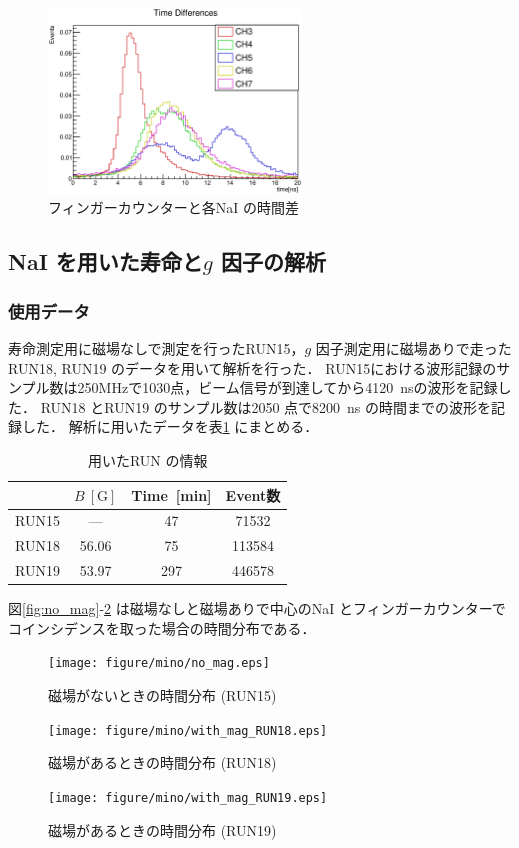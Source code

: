 \begin{figure}[hbt]
\centering
\includegraphics[width=0.6\textwidth]{figure/hatano/coincidence.eps}
\caption{フィンガーカウンターと各NaI の時間差}
\label{hatano_fig:coincidence}
\end{figure}


\subsection{NaI を用いた寿命と$g$ 因子の解析}
\subsubsection{使用データ}
寿命測定用に磁場なしで測定を行ったRUN15，$g$ 因子測定用に磁場ありで走ったRUN18, RUN19 のデータを用いて解析を行った．
RUN15における波形記録のサンプル数は250MHzで1030点，ビーム信号が到達してから4120~nsの波形を記録した．
RUN18 とRUN19 のサンプル数は2050 点で8200~ns の時間までの波形を記録した．
解析に用いたデータを表\ref{tab:RUN_info} にまとめる．

\begin{table}[H]%
\caption{用いたRUN の情報}
\centering
\begin{tabular}{cccc}\toprule
{} & $B~[\mathrm{G}]$ & Time~[min] & Event数\\ \midrule
RUN15 & --- & 47 & 71532 \\
RUN18 & 56.06 & 75 & 113584 \\
RUN19 & 53.97 & 297 & 446578 \\ \bottomrule
\end{tabular}
\label{tab:RUN_info}
\end{table}

図\ref{fig:no_mag}-\ref{fig:with_mag_RUN19} は磁場なしと磁場ありで中心のNaI とフィンガーカウンターでコインシデンスを取った場合の時間分布である．
\begin{figure}[H]
\centering
\texttt{[image: figure/mino/no\_mag.eps]}
\caption{磁場がないときの時間分布 (RUN15)}
\label{fig:no_mag}
\begin{minipage}{0.45\hsize}
\centering
\texttt{[image: figure/mino/with\_mag\_RUN18.eps]}
\caption{磁場があるときの時間分布 (RUN18)}
\end{minipage}
\begin{minipage}{0.45\hsize}
\centering
\texttt{[image: figure/mino/with\_mag\_RUN19.eps]}
\caption{磁場があるときの時間分布 (RUN19)}
\label{fig:with_mag_RUN19}
\end{minipage}
\end{figure}

